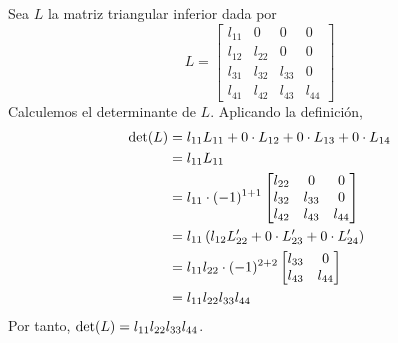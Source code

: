 \begin{example}
    Sea $L$ la matriz triangular inferior dada por
    $$L = \begin{bmatrix}
        l_{11} & 0 & 0 & 0 \\
        l_{12} & l_{22} & 0 & 0 \\
        l_{31} & l_{32} & l_{33} & 0 \\
        l_{41} & l_{42} & l_{43} & l_{44}
    \end{bmatrix}$$\newpage\noindent
    Calculemos el determinante de $L$. Aplicando la definición,
    \begin{align*}
        \operatorname{det}(L)  & = l_{11}L_{11} + 0 \cdot L_{12} + 0 \cdot L_{13} + 0 \cdot L_{14} \\
        & = l_{11}L_{11} \\
        & = l_{11} \cdot (-1)^{1+1} \begin{bmatrix}
            l_{22} & 0 & 0 \\
            l_{32} & l_{33} & 0 \\
            l_{42} & l_{43} & l_{44}
        \end{bmatrix} \\
        & = l_{11} \left( l_{12}L_{22}^{\prime} + 0 \cdot L_{23}^{\prime} + 0 \cdot L_{24}^{\prime} \right) \\
        & = l_{11}l_{22} \cdot (-1)^{2+2} \begin{bmatrix}
            l_{33} & 0 \\
            l_{43} & l_{44}
        \end{bmatrix} \\
        & = l_{11}l_{22}l_{33}l_{44}
    \end{align*}
    Por tanto, $\operatorname{det}(L) = l_{11}l_{22}l_{33}l_{44}$.
\end{example}

